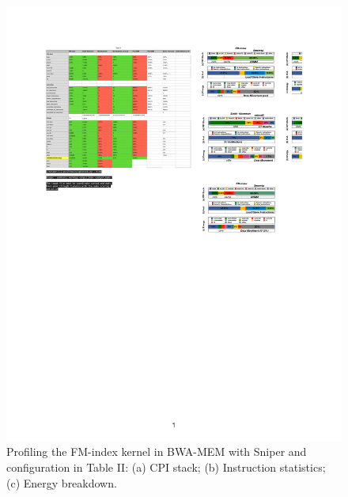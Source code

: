 \documentclass[9pt,conference]{IEEEtran}
\begin{document}
\begin{figure}[!htbp]
\centering
\includegraphics[scale=0.4]{Conference-LaTeX-template_10-17-19/fig/data-fm.pdf}
\caption{Profiling the FM-index kernel in BWA-MEM with Sniper and configuration in Table II: (a) CPI stack; (b) Instruction statistics; (c) Energy breakdown.}
\label{fig:data-fm}
\end{figure}
\end{document}
